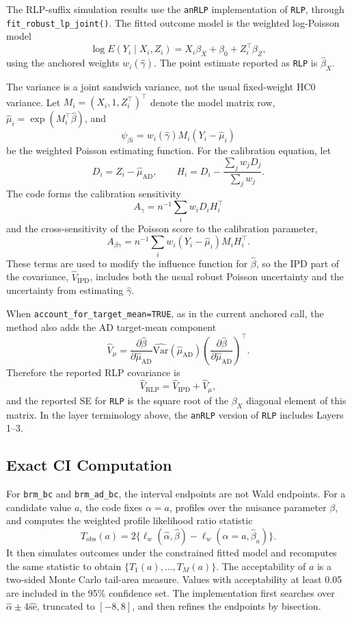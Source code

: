 \documentclass[11pt,a4paper]{article}
\begin{document}
The RLP-suffix simulation results use the \texttt{anRLP} implementation of
\texttt{RLP}, through
\texttt{fit\_robust\_lp\_joint()}.  The fitted outcome model is the weighted
log-Poisson model
\[
  \log E(Y_i\mid X_i,Z_i)
  =
  X_i\beta_X+\beta_0+Z_i^\top\beta_Z ,
\]
using the anchored weights \(w_i(\widehat\gamma)\).  The point estimate reported
as \texttt{RLP} is \(\widehat\beta_X\).

The variance is a joint sandwich variance, not the usual fixed-weight HC0
variance.  Let \(M_i=(X_i,1,Z_i^\top)^\top\) denote the model matrix row,
\(\widehat\mu_i=\exp(M_i^\top\widehat\beta)\), and
\[
  \psi_{\beta i}
  =
  w_i(\widehat\gamma)M_i(Y_i-\widehat\mu_i)
\]
be the weighted Poisson estimating function.  For the calibration equation, let
\[
  D_i=Z_i-\widehat\mu_{\mathrm{AD}},\qquad
  H_i=D_i-\frac{\sum_j w_jD_j}{\sum_j w_j}.
\]
The code forms the calibration sensitivity
\[
  A_\gamma
  =
  n^{-1}\sum_i w_i D_iH_i^\top
\]
and the cross-sensitivity of the Poisson score to the calibration parameter,
\[
  A_{\beta\gamma}
  =
  n^{-1}\sum_i w_i(Y_i-\widehat\mu_i) M_iH_i^\top .
\]
These terms are used to modify the influence function for \(\widehat\beta\), so
the IPD part of the covariance, \(\widehat V_{\mathrm{IPD}}\), includes both the
usual robust Poisson uncertainty and the uncertainty from estimating
\(\widehat\gamma\).

When \texttt{account\_for\_target\_mean=TRUE}, as in the current anchored call,
the method also adds the AD target-mean component
\[
  \widehat V_{\mu}
  =
  \frac{\partial\widehat\beta}{\partial\widehat\mu_{\mathrm{AD}}}
  \widehat{\mathrm{Var}}(\widehat\mu_{\mathrm{AD}})
  \left(
  \frac{\partial\widehat\beta}{\partial\widehat\mu_{\mathrm{AD}}}
  \right)^\top .
\]
Therefore the reported RLP covariance is
\[
  \widehat V_{\mathrm{RLP}}
  =
  \widehat V_{\mathrm{IPD}}+\widehat V_{\mu},
\]
and the reported SE for \texttt{RLP} is the square root of the
\(\beta_X\) diagonal element of this matrix.  In the layer terminology above,
the \texttt{anRLP} version of \texttt{RLP} includes Layers 1--3.

\subsection{Exact CI Computation}

For \texttt{brm\_bc} and \texttt{brm\_ad\_bc}, the interval endpoints are
not Wald endpoints.  For a candidate value \(a\), the code fixes
\(\alpha=a\), profiles over the nuisance parameter \(\beta\), and computes the
weighted profile likelihood ratio statistic
\[
  T_{\mathrm{obs}}(a)
  =
  2\{\ell_w(\widehat\alpha,\widehat\beta)
  -
  \ell_w(\alpha=a,\widehat\beta_a)\}.
\]
It then simulates outcomes under the constrained fitted model and recomputes the
same statistic to obtain \(\{T_1(a),\ldots,T_M(a)\}\).  The acceptability of
\(a\) is a two-sided Monte Carlo tail-area measure.  Values with acceptability
at least 0.05 are included in the 95\% confidence set.  The implementation first
searches over \(\widehat\alpha\pm4\widehat{\mathrm{se}}\), truncated to
\([-8,8]\), and then refines the endpoints by bisection.
\end{document}
